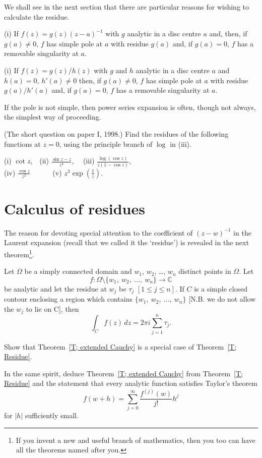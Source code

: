 We shall see in the next section that there are
particular reasons for wishing to calculate
the residue.
\begin{lemma} (i) If $f(z)=g(z)(z-a)^{-1}$ with $g$
analytic in a disc centre $a$ and, then, if $g(a)\neq 0$,
$f$ has simple pole at $a$ with residue
$g(a)$ and, if $g(a)=0$, $f$ has a removable singularity at $a$.

(i) If $f(z)=g(z)/h(z)$ with $g$ and $h$
analytic in a disc centre $a$ and $h(a)=0$, $h'(a)\neq 0$
then, if $g(a)\neq 0$, $f$ has simple pole at $a$ with residue
$g(a)/h'(a)$ and, if $g(a)=0$, 
$f$ has a removable singularity at $a$. 
\end{lemma}
If the pole is not simple, then power series expansion
is often, though not always, the simplest way of proceeding.
\begin{example} (The short question on paper I, 1998.) 
Find the residues of the following functions at $z=0$,
using the principle branch of $\log$ in (iii).
\begin{center}
(i) $\cot z$,\ \ (ii) ${\displaystyle \frac{\sin z -z}{z^{4}}}$,
\ \ (iii) ${\displaystyle \frac{\log(\cos z)}{z(1-\cos z)}}$,\\
(iv) ${\displaystyle \frac{\cos z}{z^{2}}}$
\ \ 
\ \ \ (v) ${\displaystyle z^{3}\exp\left(\frac{1}{z}\right)}$.
\end{center}
\end{example}
\section{Calculus of residues} 
The reason for devoting special attention to the
coefficient of $(z-w)^{-1}$ in the Laurent expansion
(recall that we called it the `residue') is revealed
in the next theorem\footnote{If you
invent a new and useful branch of mathematics, 
then you too can
have all the theorems named after you.}.
\begin{theorem}%
\label{T; Residue} Let
$\Omega$ be a simply connected
domain and $w_{1}$, $w_{2}$, \dots, $w_{n}$
distinct points in $\Omega$. Let
\[f:\Omega\setminus\{w_{1},\ w_{2},\ \dots ,\ w_{n}\}\rightarrow{\mathbb C}\]
be analytic and let the residue at $w_{j}$ be $\tau_{j}$
$[1\leq j\leq n]$. If $C$ is a simple closed contour
enclosing a region which contains 
$\{w_{1},\ w_{2},\ \dots ,\ w_{n}\}$ [N.B. we do not
allow the $w_{j}$ to lie on C], then
\[\int_{C}f(z)\,dz=2\pi i\sum_{j=1}^{n}\tau_{j}.\]
\end{theorem}
\begin{exercise} Show that Theorem~\ref{T; extended Cauchy}
is a special case of Theorem~\ref{T; Residue}.

In the same spirit, deduce Theorem~\ref{T; extended Cauchy}
from Theorem~\ref{T; Residue} and the statement that
every analytic function satisfies Taylor's theorem
\[f(w+h)=\sum_{j=0}^{\infty}\frac{f^{(j)}(w)}{j!}h^{j}\]
for $|h|$ sufficiently small.
\end{exercise}

